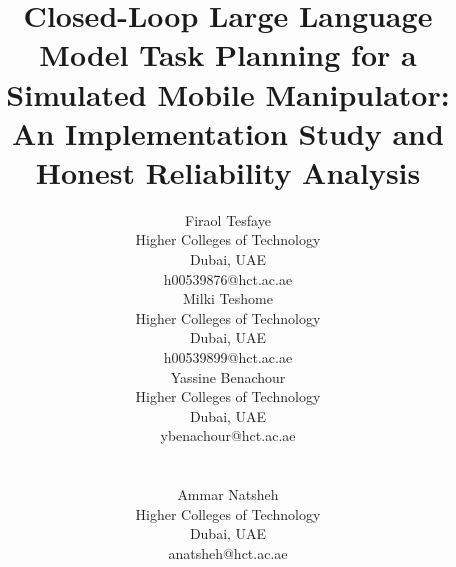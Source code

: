 \documentclass[conference]{IEEEtran}
\begin{document}
\title{Closed-Loop Large Language Model Task Planning for a Simulated
Mobile Manipulator:\\ An Implementation Study and Honest Reliability Analysis}

\author{%
\begin{minipage}{\textwidth}\centering
  \begin{minipage}[t]{0.31\textwidth}\centering
    Firaol Tesfaye\\
    Higher Colleges of Technology\\
    Dubai, UAE\\
    h00539876@hct.ac.ae
  \end{minipage}\hfill
  \begin{minipage}[t]{0.31\textwidth}\centering
    Milki Teshome\\
    Higher Colleges of Technology\\
    Dubai, UAE\\
    h00539899@hct.ac.ae
  \end{minipage}\hfill
  \begin{minipage}[t]{0.31\textwidth}\centering
    Yassine Benachour\\
    Higher Colleges of Technology\\
    Dubai, UAE\\
    ybenachour@hct.ac.ae
  \end{minipage}\\[1.3em]
  \begin{minipage}[t]{0.31\textwidth}\centering
    Ammar Natsheh\\
    Higher Colleges of Technology\\
    Dubai, UAE\\
    anatsheh@hct.ac.ae
  \end{minipage}
\end{minipage}}

\maketitle
\end{document}
